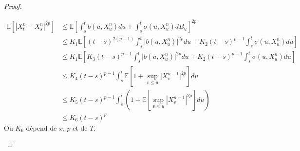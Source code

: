 \documentclass[A4paper,12pt]{report}
\newcommand{\E}{{\mathbb{E}}}
\begin{document}
\begin{proof}
\begin{enumerate}
\begin{align*}
\E\left[\left|X_{t}^{n}-X_{s}^{n}\right|^{2 p}\right] &\leq \E \left[\int_s ^t b(u,X_u ^n) du + \int_s ^t \sigma(u, X_u ^n) dB_u \right]^{2p}\\
&\leq K_1 \E\left[(t-s)^{2(p-1)} \int_s ^t \lvert b(u,X_u ^n) \rvert^{2p} du + K_2 (t-s)^{p-1} \int_s ^t \sigma(u, X_u ^n) du \right]\\
&\leq K_1 \E\left[K_3(t-s)^{p-1} \int_s ^t \lvert b(u,X_u ^n) \rvert^{2p} du + K_2 (t-s)^{p-1} \int_s ^t \sigma(u, X_u ^n) du \right]\\
&\leq K_4 (t-s)^{p-1}  \int_{s}^{t} \E \left[1+ \sup_{v \leq u} \lvert X_v ^{n-1}\rvert^{2p} \right] du\\
&\leq K_{5}(t-s)^{p-1} \int_{s}^{t} (1 + \E\left[\sup _{v \leq u}\left|X_{v}^{n-1}\right|^{2 p}\right] d u)\\
&\leq K_6 (t-s)^{p}
\end{align*}
Où $K_6$ dépend de $x$, $p$ et de $T$.
\end{enumerate}

\end{proof}
\end{document}
